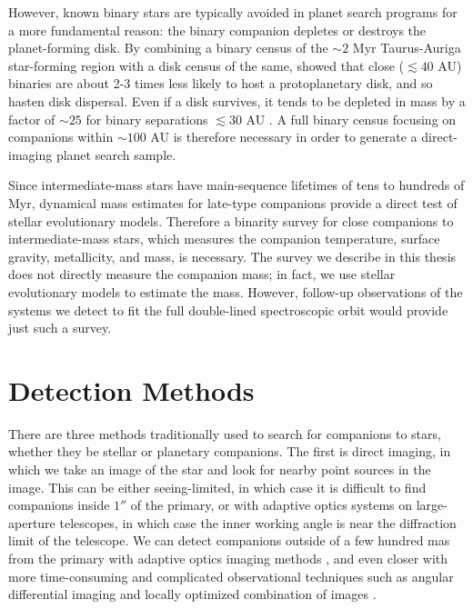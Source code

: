 \documentclass{utthesis}
\begin{document}
However, known binary stars are typically avoided in planet search programs for a more fundamental reason: the binary companion depletes or destroys the planet-forming disk. By combining a binary census of the $\sim 2$ Myr Taurus-Auriga star-forming region with a disk census of the same, \cite{Kraus2012} showed that close ($\lesssim 40$ AU) binaries are about 2-3 times less likely to host a protoplanetary disk, and so hasten disk dispersal. Even if a disk survives, it tends to be depleted in mass by a factor of $\sim 25$ for binary separations $\lesssim 30$ AU \citep{Harris2012}. A full binary census focusing on companions within $\sim 100$ AU is therefore necessary in order to generate a direct-imaging planet search sample.

Since intermediate-mass stars have main-sequence lifetimes of tens to hundreds of Myr, dynamical mass estimates for late-type companions provide a direct test of stellar evolutionary models. Therefore a binarity survey for close companions to intermediate-mass stars, which measures the companion temperature, surface gravity, metallicity, and mass, is necessary. The survey we describe in this thesis does not directly measure the companion mass; in fact, we use stellar evolutionary models to estimate the mass. However, follow-up observations of the systems we detect to fit the full double-lined spectroscopic orbit would provide just such a survey.




\section{Detection Methods}

There are three methods traditionally used to search for companions to stars, whether they be stellar or planetary companions. The first is direct imaging, in which we take an image of the star and look for nearby point sources in the image. This can be either seeing-limited, in which case it is difficult to find companions inside $1''$ of the primary, or with adaptive optics systems on large-aperture telescopes, in which case the inner working angle is near the diffraction limit of the telescope. We can detect companions outside of a few hundred mas from the primary with adaptive optics imaging methods \citep[see][for typical sensitivity curves of a binary survey]{DeRosa2014}, and even closer with more time-consuming and complicated observational techniques such as angular differential imaging \citep{Marois2006} and locally optimized combination of images \citep[LOCI,][]{Lafreniere2007}.
\end{document}
